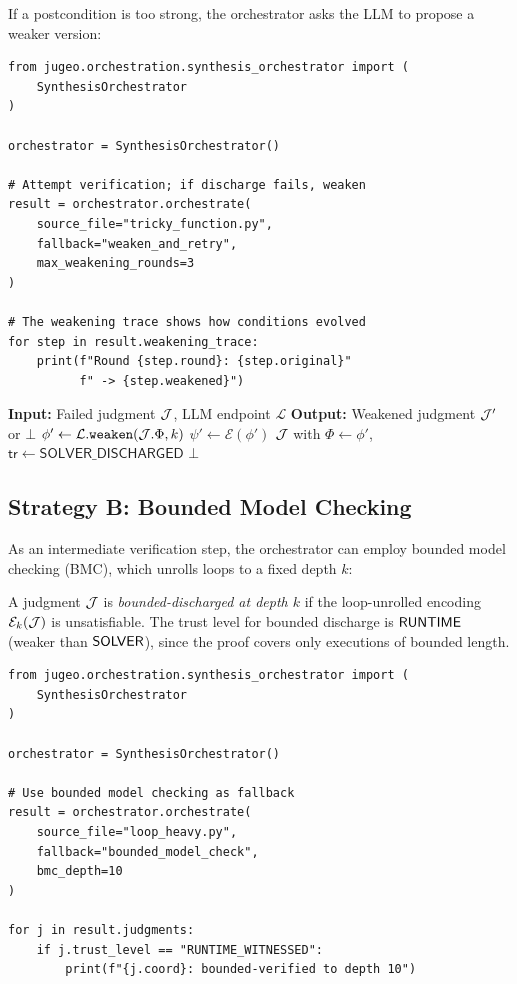 \documentclass[11pt]{article}
\newcommand{\SolverDisch}{\ensuremath{\mathsf{SOLVER\_DISCHARGED}}}
\newcommand{\props}{\Phi}                           %
\newcommand{\tr}{\mathsf{tr}}                        %
\newcommand{\smtenc}{\mathcal{E}}
\begin{document}
If a postcondition is too strong, the orchestrator asks the LLM to
propose a weaker version:

\begin{lstlisting}[style=jugeo-python]
from jugeo.orchestration.synthesis_orchestrator import (
    SynthesisOrchestrator
)

orchestrator = SynthesisOrchestrator()

# Attempt verification; if discharge fails, weaken
result = orchestrator.orchestrate(
    source_file="tricky_function.py",
    fallback="weaken_and_retry",
    max_weakening_rounds=3
)

# The weakening trace shows how conditions evolved
for step in result.weakening_trace:
    print(f"Round {step.round}: {step.original}"
          f" -> {step.weakened}")
\end{lstlisting}

\begin{algorithm}[H]
\caption{Weakening Fallback}
\label{alg:weakening}
\begin{algorithmic}[1]
\STATE \textbf{Input:} Failed judgment $\mathcal{J}$, LLM endpoint $\mathcal{L}$
\STATE \textbf{Output:} Weakened judgment $\mathcal{J}'$ or $\bot$
  \STATE $\phi' \gets \mathcal{L}.\texttt{weaken}(\J.\props, k)$
  \STATE $\psi' \gets \smtenc(\phi')$
    \STATE \RETURN $\mathcal{J}$ with $\props \gets \phi'$, $\tr \gets \SolverDisch$
  \ENDIF
\ENDFOR
\RETURN $\bot$
\end{algorithmic}
\end{algorithm}

\subsection{Strategy B: Bounded Model Checking}

As an intermediate verification step, the orchestrator can employ
bounded model checking (BMC), which unrolls loops to a fixed depth $k$:

\begin{definition}\label{def:bounded-discharge}
A judgment $\mathcal{J}$ is \emph{bounded-discharged at depth $k$} if the
loop-unrolled encoding $\smtenc_k(\J)$ is unsatisfiable.  The trust
level for bounded discharge is $\mathsf{RUNTIME}$ (weaker than $\mathsf{SOLVER}$),
since the proof covers only executions of bounded length.
\end{definition}

\begin{lstlisting}[style=jugeo-python]
from jugeo.orchestration.synthesis_orchestrator import (
    SynthesisOrchestrator
)

orchestrator = SynthesisOrchestrator()

# Use bounded model checking as fallback
result = orchestrator.orchestrate(
    source_file="loop_heavy.py",
    fallback="bounded_model_check",
    bmc_depth=10
)

for j in result.judgments:
    if j.trust_level == "RUNTIME_WITNESSED":
        print(f"{j.coord}: bounded-verified to depth 10")
\end{lstlisting}
\end{document}
